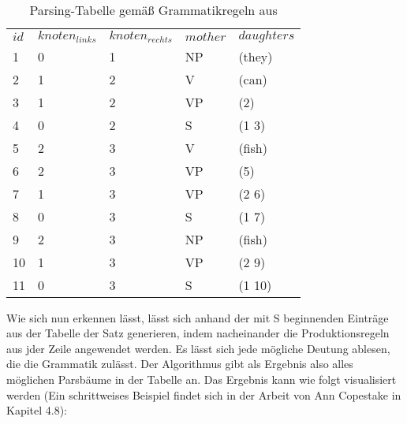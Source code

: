 \documentclass[12pt]{paper}
\begin{document}
\begin{table}
\tt
\begin{tabular}{lllll}
$id$ & $knoten_{links}$ & $knoten_{rechts}$ & $mother$ & $daughters$ \\
1    & 0                & 1                 & NP       & (they)      \\
2    & 1                & 2                 & V        & (can)       \\
3    & 1                & 2                 & VP       & (2)         \\
4    & 0                & 2                 & S        & (1 3)       \\
5    & 2                & 3                 & V        & (fish)      \\
6    & 2                & 3                 & VP       & (5)         \\
7    & 1                & 3                 & VP       & (2 6)       \\
8    & 0                & 3                 & S        & (1 7)       \\
9    & 2                & 3                 & NP       & (fish)      \\
10   & 1                & 3                 & VP       & (2 9)       \\
11   & 0                & 3                 & S        & (1 10)     
\end{tabular}
\rm
\caption{Parsing-Tabelle gemäß Grammatikregeln aus \cite{cop04}}

Wie sich nun erkennen lässt, lässt sich anhand der mit S beginnenden Einträge aus der Tabelle der Satz generieren, indem nacheinander die Produktionsregeln aus jder Zeile angewendet werden. Es lässt sich jede mögliche Deutung ablesen, die die Grammatik zulässt. Der Algorithmus gibt als Ergebnis also alles möglichen Parsbäume in der Tabelle an. Das Ergebnis kann wie folgt visualisiert werden (Ein schrittweises Beispiel findet sich in der Arbeit von Ann Copestake in Kapitel 4.8):

\end{table}
\end{document}
